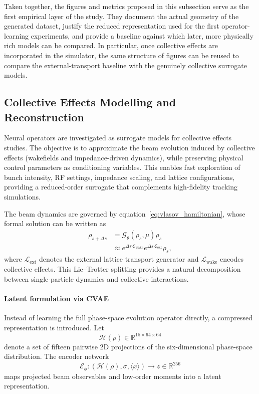 \documentclass[11pt,a4paper]{article}
\begin{document}
\begin{sloppypar}
Taken together, the figures and metrics proposed in this subsection serve as the first empirical layer of the
study. They document the actual geometry of the generated dataset, justify the reduced representation used
for the first operator-learning experiments, and provide a baseline against which later, more physically rich
models can be compared. In particular, once collective effects are incorporated in the simulator, the same
structure of figures can be reused to compare the external-transport baseline with the genuinely collective
surrogate models.
\subsection{Collective Effects Modelling and Reconstruction}

Neural operators are investigated as surrogate models for collective effects studies. The objective is to approximate the beam evolution induced by collective effects (wakefields and impedance-driven dynamics), while preserving physical control parameters as conditioning variables. This enables fast exploration of bunch intensity, RF settings, impedance scaling, and lattice configurations, providing a reduced-order surrogate that complements high-fidelity tracking simulations.

The beam dynamics are governed by equation~\eqref{eq:vlasov_hamiltonian}, whose formal solution can be written as
\begin{equation}
    \begin{split}
        \rho_{s+\Delta s}
        &= \mathcal{G}_\theta(\rho_s,\mu)\rho_s \\
        &\approx e^{\Delta s \mathcal{L}_{\mathrm{wake}}}
        e^{\Delta s \mathcal{L}_{\mathrm{ext}}}\rho_s,
    \end{split}
\end{equation}
where $\mathcal{L}_{\mathrm{ext}}$ denotes the external lattice transport generator and $\mathcal{L}_{\mathrm{wake}}$ encodes collective effects. This Lie--Trotter splitting provides a natural decomposition between single-particle dynamics and collective interactions.

\paragraph{Latent formulation via CVAE}

Instead of learning the full phase-space evolution operator directly, a compressed representation is introduced. Let
\begin{equation}
\mathcal{H}(\rho)\in\mathbb{R}^{15\times64\times64}
\end{equation}
denote a set of fifteen pairwise 2D projections of the six-dimensional phase-space distribution. The encoder network
\begin{equation}
\mathcal{E}_{\phi}:
\left(
\mathcal{H}(\rho),\sigma,\langle x\rangle
\right)
\rightarrow z\in\mathbb{R}^{256}
\end{equation}
maps projected beam observables and low-order moments into a latent representation.


\end{sloppypar}
\end{document}
